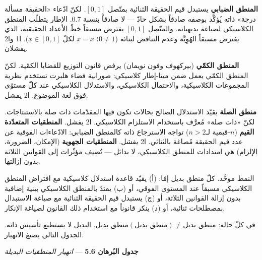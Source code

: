 \documentclass[10pt, openany, oneside]{book}
\begin{document}
\textbf{المنطق الضبابي} يستبدل قيم الحقيقة الثنائية بمتّصل $[0, 1]$. لكنّ ادّعاء «الحقيقة مسألة درجة» ذاته يُؤكَّد بوصفه صادقاً بشكل حادّ --- لا صادقاً بنسبة 0.7. الإطار يتطلّب المنطق الكلاسيكي لصياغة بديهياته. والمتّصل $[0, 1]$ يفترض مسبقاً خطّ الأعداد الحقيقية، الذي يفترض مسبقاً الهُوِيَّة وعدم التناقض لبنائه ($0 \neq 1$؛ $x = x$ لكلّ $x \in [0,1]$). ا1 وا2 يفشلان.

\textbf{المنطق الكمّي} (بيركهوف وفون نويمان) يرفض قانون التوزيع للقضايا الكمّية. لكنّ المنطق الكمّي يعمل ضمن ميتا-إطار كلاسيكي: صورانية فضاء هلبرت تستخدم نظرية المجموعات الكلاسيكية، والاحتمال الكلاسيكي، والاستدلال الكلاسيكي عند كلّ مستوًى فوق لغة الموضوع. ا2 يفشل.

\textbf{منطق الصلة} يقيّد الاستدلال الصالح بحالات تكون فيها المقدّمات ذات صلة بالاستنتاجات. لكنّ «ذات صلة» مُعرَّف باستخدام الاستلزام الكلاسيكي. ا2 يفشل. \textbf{المنطقيات المتعدّدة القيم} ($n$-قيمية لـ$n > 2$) تواجه الاسترجاع ذاته كالمنطق الضبابي: الادّعاءات الفوقية عن عدد قيم الحقيقة مُصاغة بالثنائي. ا2 يفشل. \textbf{المنطقيات الجهوية} (الإمكان، الضرورة، الإلزام) هي امتدادات للمنطق الكلاسيكي، لا بدائل --- تُضيف مؤثّرات إلى القوانين الثلاثة بدون إزالتها.

النمط موحَّد. كلّ منطق بديل إمّا: (أ) يقيّد قاعدة استدلال كلاسيكية مع افتراض المنطق الكلاسيكي مسبقاً عند المستوى الفوقي، أو (ب) يمتدّ بالمنطق الكلاسيكي ببنية إضافية بدون إزالة القوانين الثلاثة، أو (ج) يستبدل قيم الحقيقة الثنائية مع صياغة الاستبدال بمصطلحات ثنائية، أو (د) ينكر قانوناً مع استخدام ذلك القانون لصياغة الإنكار.

في كلّ حالة: $\text{منطق بديل}(\text{منطق بديل}) \neq \text{منطق بديل}$. البديل لا يستطيع تأسيس ذاته. الجدول التالي يصيغ الانهيار.

\vspace{0.8em}

\textbf{جدول البُرهان 5.6} --- \textit{انهيار المنطقيات البديلة}

\vspace{0.5em}
\end{document}
